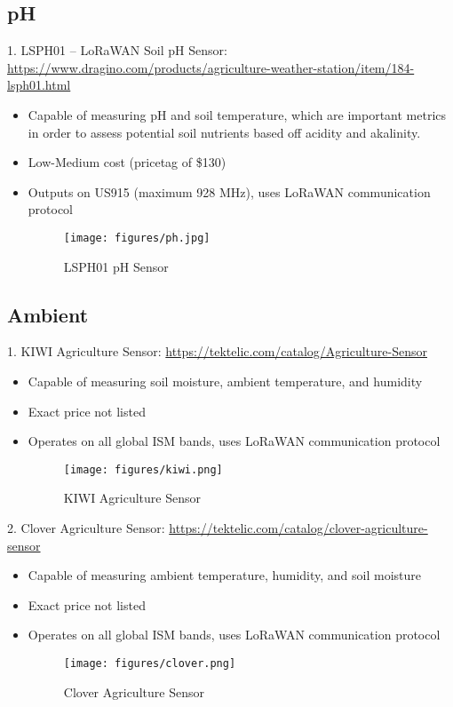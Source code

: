 \documentclass{article}
\begin{document}
\subsection{pH}
1. LSPH01 -- LoRaWAN Soil pH Sensor: \url{https://www.dragino.com/products/agriculture-weather-station/item/184-lsph01.html}
\begin{itemize}

\item Capable of measuring pH and soil temperature, which are important metrics in order to assess potential soil nutrients based off acidity and akalinity.
\item Low-Medium cost (pricetag of \$130)	
\item Outputs on US915 (maximum 928 MHz), uses LoRaWAN communication protocol

\begin{figure}[htp]
    \centering
    \texttt{[image: figures/ph.jpg]}
    \caption{LSPH01 pH Sensor}
\end{figure}

\end{itemize}

\subsection{Ambient}
1. KIWI Agriculture Sensor: \url{https://tektelic.com/catalog/Agriculture-Sensor}
\begin{itemize}

\item Capable of measuring soil moisture, ambient temperature, and humidity
\item Exact price not listed
\item Operates on all global ISM bands, uses LoRaWAN communication protocol

\begin{figure}[htp]
    \centering
    \texttt{[image: figures/kiwi.png]}
    \caption{KIWI Agriculture Sensor}
\end{figure}

\end{itemize}

\item 2. Clover Agriculture Sensor: \url{https://tektelic.com/catalog/clover-agriculture-sensor}
\begin{itemize}

\item Capable of measuring ambient temperature, humidity, and soil moisture
\item Exact price not listed
\item Operates on all global ISM bands, uses LoRaWAN communication protocol

\begin{figure}[htp]
    \centering
    \texttt{[image: figures/clover.png]}
    \caption{Clover Agriculture Sensor}
\end{figure}

\end{itemize}
\end{document}
